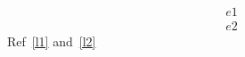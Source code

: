 \documentclass{scrartcl}
\begin{document}
\begin{align}
\label{l1}\tag{t1}e1\\
\label{l2}\tag{t2}e2
\end{align}
Ref~\eqref{l1} and~\eqref{l2}
\end{document}
